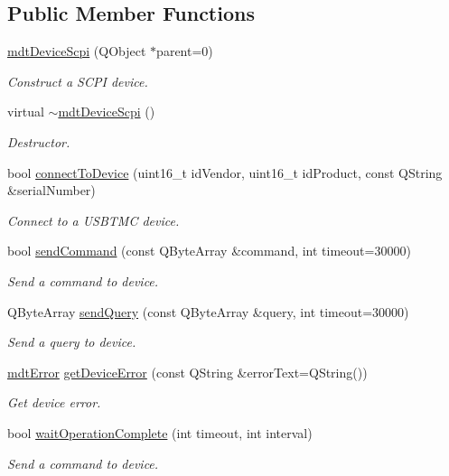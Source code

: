\subsection*{Public Member Functions}
\begin{DoxyCompactItemize}
\item 
\hyperlink{classmdt_device_scpi_a44c03151a6796e5c1efd64ef55f2d14d}{mdt\-Device\-Scpi} (Q\-Object $\ast$parent=0)
\begin{DoxyCompactList}\small\item\em Construct a S\-C\-P\-I device. \end{DoxyCompactList}\item 
virtual \hyperlink{classmdt_device_scpi_ae173b9ad3d528005e124624ca9bb7b64}{$\sim$mdt\-Device\-Scpi} ()
\begin{DoxyCompactList}\small\item\em Destructor. \end{DoxyCompactList}\item 
bool \hyperlink{classmdt_device_scpi_a94c8fde98a0fa2f933b3c069aa1e4fa0}{connect\-To\-Device} (uint16\-\_\-t id\-Vendor, uint16\-\_\-t id\-Product, const Q\-String \&serial\-Number)
\begin{DoxyCompactList}\small\item\em Connect to a U\-S\-B\-T\-M\-C device. \end{DoxyCompactList}\item 
bool \hyperlink{classmdt_device_scpi_a59759a6138c3ecbcb5cb98a042f8bcb5}{send\-Command} (const Q\-Byte\-Array \&command, int timeout=30000)
\begin{DoxyCompactList}\small\item\em Send a command to device. \end{DoxyCompactList}\item 
Q\-Byte\-Array \hyperlink{classmdt_device_scpi_a6dd5bd26c3178c5ba150d813a91e67c9}{send\-Query} (const Q\-Byte\-Array \&query, int timeout=30000)
\begin{DoxyCompactList}\small\item\em Send a query to device. \end{DoxyCompactList}\item 
\hyperlink{classmdt_error}{mdt\-Error} \hyperlink{classmdt_device_scpi_a45093d4dac06457ee088f45cbec79f3d}{get\-Device\-Error} (const Q\-String \&error\-Text=Q\-String())
\begin{DoxyCompactList}\small\item\em Get device error. \end{DoxyCompactList}\item 
bool \hyperlink{classmdt_device_scpi_aefd45e58d01aed9a165bb2c2dd98198c}{wait\-Operation\-Complete} (int timeout, int interval)
\begin{DoxyCompactList}\small\item\em Send a command to device. \end{DoxyCompactList}\end{DoxyCompactItemize}

